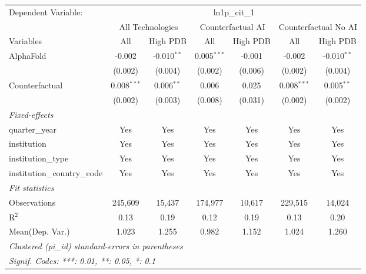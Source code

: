\begingroup
\centering
\begin{tabular}{lcccccc}
   \tabularnewline \midrule \midrule
   Dependent Variable: & \multicolumn{6}{c}{ln1p\_cit\_1}\\
 & \multicolumn{2}{c}{All Technologies} & \multicolumn{2}{c}{Counterfactual AI} & \multicolumn{2}{c}{Counterfactual No AI} \\
\cmidrule(lr){1-1}\cmidrule(lr){2-3} \cmidrule(lr){4-5} \cmidrule(lr){6-7}
Variables & \multicolumn{1}{c}{All} & \multicolumn{1}{c}{High PDB} & \multicolumn{1}{c}{All} & \multicolumn{1}{c}{High PDB} & \multicolumn{1}{c}{All} & \multicolumn{1}{c}{High PDB} \\
\cmidrule(lr){1-1}\cmidrule(lr){2-2} \cmidrule(lr){3-3} \cmidrule(lr){4-4} \cmidrule(lr){5-5} \cmidrule(lr){6-6} \cmidrule(lr){7-7}
   AlphaFold                    & -0.002        & -0.010$^{**}$ & 0.005$^{***}$ & -0.001  & -0.002        & -0.010$^{**}$\\   
                                & (0.002)       & (0.004)       & (0.002)       & (0.006) & (0.002)       & (0.004)\\   
   Counterfactual               & 0.008$^{***}$ & 0.006$^{**}$  & 0.006         & 0.025   & 0.008$^{***}$ & 0.005$^{**}$\\   
                                & (0.002)       & (0.003)       & (0.008)       & (0.031) & (0.002)       & (0.002)\\   
   \midrule
   \emph{Fixed-effects}\\
   quarter\_year                & Yes           & Yes           & Yes           & Yes     & Yes           & Yes\\  
   institution                  & Yes           & Yes           & Yes           & Yes     & Yes           & Yes\\  
   institution\_type            & Yes           & Yes           & Yes           & Yes     & Yes           & Yes\\  
   institution\_country\_code   & Yes           & Yes           & Yes           & Yes     & Yes           & Yes\\  
   \midrule
   \emph{Fit statistics}\\
   Observations                 & 245,609       & 15,437        & 174,977       & 10,617  & 229,515       & 14,024\\  
   R$^2$                        & 0.13          & 0.19          & 0.12          & 0.19    & 0.13          & 0.20\\  
Mean(Dep. Var.) & 1.023 & 1.255 & 0.982 & 1.152 & 1.024 & 1.260 \\
   \midrule \midrule
   \multicolumn{7}{l}{\emph{Clustered (pi\_id) standard-errors in parentheses}}\\
   \multicolumn{7}{l}{\emph{Signif. Codes: ***: 0.01, **: 0.05, *: 0.1}}\\
\end{tabular}
\par\endgroup

